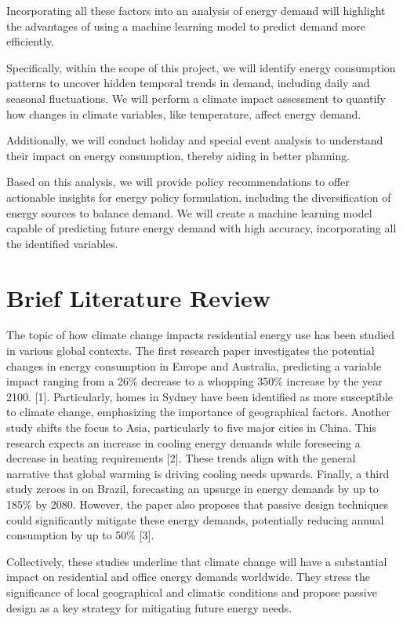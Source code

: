 \documentclass[mstat,12pt]{unswthesis}
\begin{document}
Incorporating all these factors into an analysis of energy demand will
highlight the advantages of using a machine learning model to predict
demand more efficiently.

Specifically, within the scope of this project, we will identify energy
consumption patterns to uncover hidden temporal trends in demand,
including daily and seasonal fluctuations. We will perform a climate
impact assessment to quantify how changes in climate variables, like
temperature, affect energy demand.

Additionally, we will conduct holiday and special event analysis to
understand their impact on energy consumption, thereby aiding in better
planning.

Based on this analysis, we will provide policy recommendations to offer
actionable insights for energy policy formulation, including the
diversification of energy sources to balance demand. We will create a
machine learning model capable of predicting future energy demand with
high accuracy, incorporating all the identified variables.

\hypertarget{brief-literature-review}{%
\section{Brief Literature Review}\label{brief-literature-review}}

The topic of how climate change impacts residential energy use has been
studied in various global contexts. The first research paper
investigates the potential changes in energy consumption in Europe and
Australia, predicting a variable impact ranging from a 26\% decrease to
a whopping 350\% increase by the year 2100. {[}1{]}. Particularly, homes
in Sydney have been identified as more susceptible to climate change,
emphasizing the importance of geographical factors. Another study shifts
the focus to Asia, particularly to five major cities in China. This
research expects an increase in cooling energy demands while foreseeing
a decrease in heating requirements {[}2{]}. These trends align with the
general narrative that global warming is driving cooling needs upwards.
Finally, a third study zeroes in on Brazil, forecasting an upsurge in
energy demands by up to 185\% by 2080. However, the paper also proposes
that passive design techniques could significantly mitigate these energy
demands, potentially reducing annual consumption by up to 50\% {[}3{]}.

Collectively, these studies underline that climate change will have a
substantial impact on residential and office energy demands worldwide.
They stress the significance of local geographical and climatic
conditions and propose passive design as a key strategy for mitigating
future energy needs.
\end{document}
